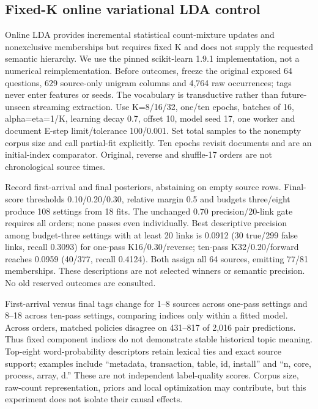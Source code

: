 \documentclass[11pt]{article}
\begin{document}
\subsection{Fixed-K online variational LDA control}
Online LDA\cite{onlinelda} provides incremental statistical count-mixture
updates and nonexclusive memberships but requires fixed K and does not supply
the requested semantic hierarchy. We use the pinned scikit-learn 1.9.1
implementation\cite{sklearnlda}, not a numerical reimplementation. Before
outcomes, freeze the original exposed 64 questions, 629 source-only unigram
columns and 4,764 raw occurrences; tags never enter features or seeds. The
vocabulary is transductive rather than future-unseen streaming extraction.
Use K=8/16/32, one/ten epochs, batches of 16, alpha=eta=1/K, learning decay
0.7, offset 10, model seed 17, one worker and document E-step limit/tolerance
100/0.001. Set total samples to the nonempty corpus size and call partial-fit
explicitly. Ten epochs revisit documents and are an initial-index comparator.
Original, reverse and shuffle-17 orders are not chronological source times.

Record first-arrival and final posteriors, abstaining on empty source rows.
Final-score thresholds 0.10/0.20/0.30, relative margin 0.5 and budgets three/eight
produce 108 settings from 18 fits. The unchanged 0.70 precision/20-link gate
requires all orders; none passes even individually. Best descriptive precision
among budget-three settings with at least 20 links is 0.0912 (30 true/299 false
links, recall 0.3093) for one-pass K16/0.30/reverse; ten-pass K32/0.20/forward
reaches 0.0959 (40/377, recall 0.4124). Both assign all 64 sources, emitting
77/81 memberships. These descriptions are not selected winners or semantic
precision. No old reserved outcomes are consulted.

First-arrival versus final tags change for 1--8 sources across one-pass settings
and 8--18 across ten-pass settings, comparing indices only within a fitted model.
Across orders, matched policies disagree on 431--817 of 2,016 pair predictions.
Thus fixed component indices do not demonstrate stable historical topic meaning.
Top-eight word-probability descriptors retain lexical ties and exact source
support; examples include ``metadata, transaction, table, id, install'' and
``n, core, process, array, d.'' These are not independent label-quality scores.
Corpus size, raw-count representation, priors and local optimization may
contribute, but this experiment does not isolate their causal effects.
\end{document}
